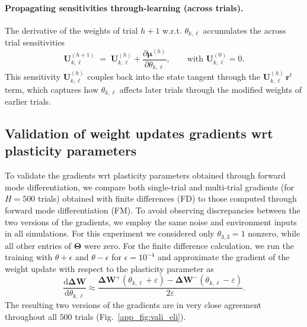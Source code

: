 \documentclass[mlabstract]{jmlr}
\newcommand{\de}{\text{d}}
\begin{document}
\paragraph{Propagating sensitivities through-learning (across trials).}
The derivative of the weights of trial $h+1$ w.r.t. $\theta_{k,\ell}$ accumulates the across trial sensitivities
\begin{equation}\label{eq:weight_sensitivities_1}
 \mathbf{U}_{k,\ell}^{(h+1)} \;=\; \mathbf{U}_{k,\ell}^{(h)} + \frac{\partial \boldsymbol{\mu}^{(h)}}{\partial \theta_{k,\ell}},\qquad \text{with   } \mathbf{U}_{k,\ell}^{(0)}=0.
\end{equation}
This sensitivity $\mathbf{U}_{k,\ell}^{(h)}$ couples back into the state tangent through the $\mathbf{U}_{k,\ell}^{(h)}\,\mathbf{r}^t$ term, which captures how $\theta_{k,\ell}$ affects later trials through the modified weights of earlier trials.


\subsection{Validation of weight updates gradients wrt plasticity parameters}
To validate the gradients wrt plasticity parameters obtained through forward mode differentiation, we compare both single-trial and multi-trial gradients (for $H=500$ trials) obtained with finite differences (FD) to those computed through forward mode differentiation (FM). To avoid observing discrepancies between the two versions of the gradients, we employ the same noise and environment inputs in all simulations. For this experiment we considered only $\theta_{3,3}=1$ nonzero, while all other entries of $\boldsymbol{\Theta}$ were zero. For the finite difference calculation, we run the training with $\theta + \epsilon$ and $\theta - \epsilon$ for $\epsilon=10^{-4}$ and approximate the gradient of the weight update with respect to the plasticity parameter as
\begin{equation}
\frac{\de \boldsymbol{\Delta} \mathbf{W}}{\de \theta_{k,\ell}}\approx\frac{\boldsymbol{\Delta} \mathbf{W}^+ \left(\theta_{k,\ell} + \varepsilon \right) - \boldsymbol{\Delta} \mathbf{W}^-\left(\theta_{k,\ell} - \varepsilon \right)}{2\varepsilon}.
\end{equation}
The resulting two versions of the gradients are in very close agreement throughout all $500$ trials (Fig.~\ref{app_fig:vali_eli}).
\end{document}
